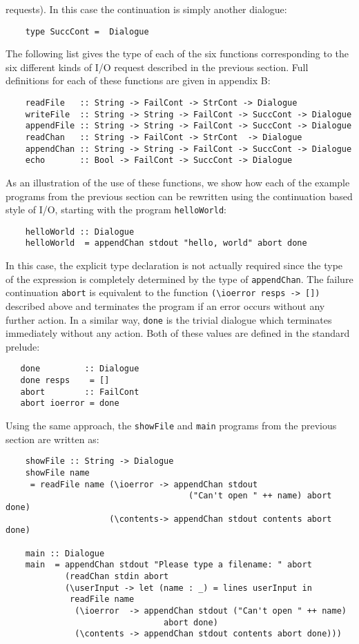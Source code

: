 requests).  In this case the continuation is simply another dialogue:
\begin{verbatim}
    type SuccCont =  Dialogue
\end{verbatim}
The following list  gives  the  type  of  each  of  the  six  functions
corresponding to the six different kinds of I/O  request  described  in
the previous section.  Full definitions for each of these functions are
given in appendix B:
\begin{verbatim}
    readFile   :: String -> FailCont -> StrCont -> Dialogue
    writeFile  :: String -> String -> FailCont -> SuccCont -> Dialogue
    appendFile :: String -> String -> FailCont -> SuccCont -> Dialogue
    readChan   :: String -> FailCont -> StrCont  -> Dialogue
    appendChan :: String -> String -> FailCont -> SuccCont -> Dialogue
    echo       :: Bool -> FailCont -> SuccCont -> Dialogue
\end{verbatim}
As an illustration of the use of these functions, we show how  each  of
the example programs from the previous section can be  rewritten  using
the  continuation  based  style  of  I/O,  starting  with  the  program
\verb"helloWorld":
\begin{verbatim}
    helloWorld :: Dialogue
    helloWorld  = appendChan stdout "hello, world" abort done
\end{verbatim}
In this case, the explicit type declaration is  not  actually  required
since the type of the expression is completely determined by  the  type
of \verb"appendChan".  The failure continuation 
\verb"abort" is equivalent to the
function \verb"(\ioerror resps -> [])" described above  and  terminates  the
program if an error occurs without any further action.   In  a  similar
way, \verb"done"  is  the  trivial  dialogue  which  terminates  immediately
without any action.  Both of these values are defined in the standard
prelude:
\begin{verbatim}
   done         :: Dialogue
   done resps    = []
   abort        :: FailCont
   abort ioerror = done
\end{verbatim} 
Using the same approach, the \verb"showFile" and \verb"main"  programs  from  the
previous section are written as:
\begin{verbatim}
    showFile :: String -> Dialogue
    showFile name
     = readFile name (\ioerror -> appendChan stdout
                                     ("Can't open " ++ name) abort done)
                     (\contents-> appendChan stdout contents abort done)
 
    main :: Dialogue
    main  = appendChan stdout "Please type a filename: " abort
            (readChan stdin abort
            (\userInput -> let (name : _) = lines userInput in
             readFile name
              (\ioerror  -> appendChan stdout ("Can't open " ++ name)
                                abort done)
              (\contents -> appendChan stdout contents abort done)))
\end{verbatim}

